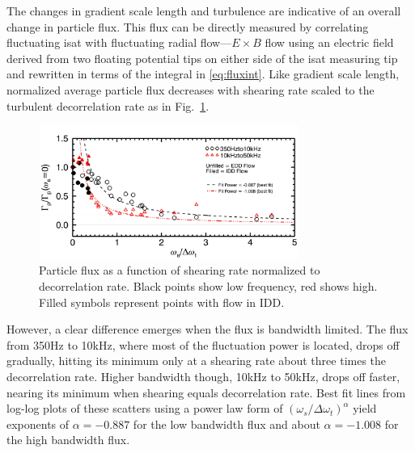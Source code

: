 \documentclass[%
 aps,
 prl,
 amsmath,amssymb,
 reprint,%
]{revtex4-1}
\begin{document}
The changes in gradient scale length and turbulence are indicative of an overall change in particle flux. This flux can be directly measured by correlating fluctuating isat with fluctuating radial flow---$E \times B$ flow using an electric field derived from two floating potential tips on either side of the isat measuring tip and rewritten in terms of the integral in \eqref{eq:fluxint}. Like gradient scale length, normalized average particle flux decreases with shearing rate scaled to the turbulent decorrelation rate as in 
Fig.~\ref{fig:fluxvsshear}. 
\begin{figure}
\begin{center}
\includegraphics[width=8.5cm]{fluxvsshear.pdf}%
\end{center}
\caption{\label{fig:fluxvsshear} Particle flux as a function of shearing rate normalized to decorrelation rate. Black points show low frequency, red shows high. Filled symbols represent points with flow in IDD.}
\end{figure}
However, a clear difference emerges when the flux is bandwidth limited. The flux from 350Hz to 10kHz, where most of the fluctuation power is located, drops off gradually, hitting its minimum only at a shearing rate about three times the decorrelation rate. Higher bandwidth though, 10kHz to 50kHz, drops off faster, nearing its minimum when shearing equals decorrelation rate. Best fit lines from log-log plots of these scatters using a power law form of $\left(\omega_{s}/\Delta \omega_{t}\right)^{\alpha}$ yield exponents of $\alpha = -0.887$ for the low bandwidth flux and about $\alpha = -1.008$ for the high bandwidth flux. 
\end{document}
